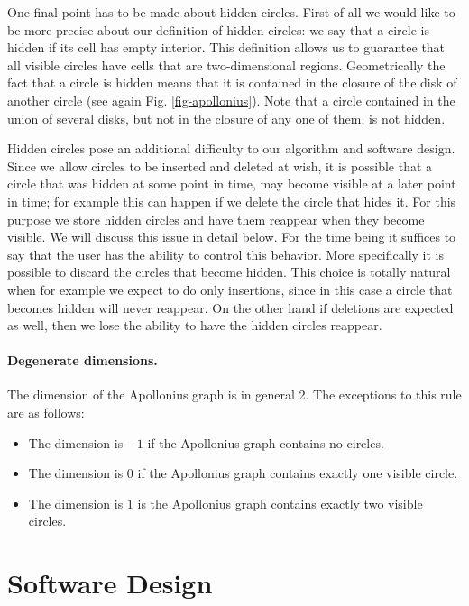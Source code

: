 One final point has to be made about hidden circles. First of all we
would like to be more precise about our definition of hidden circles:
we say that a circle is hidden if its cell has empty interior. This
definition allows us to guarantee that all visible circles have
cells that are two-dimensional regions.
Geometrically the fact that a circle is hidden means that it is
contained in the closure of the disk of another circle (see again
Fig. \ref{fig-apollonius}). Note that a circle contained in the union
of several disks, but not in the closure of any one of them, is not
hidden. 

Hidden circles pose an additional
difficulty to our algorithm and software design. Since we allow
circles to be inserted and deleted at wish, it is possible that a
circle that was hidden at some point in time, may become visible at
a later point in time; for example this can happen if we delete the
circle that hides it. For this purpose we store hidden circles and
have them reappear when they become visible. We will discuss this
issue in detail below. For the time being it suffices to say that the
user has the ability to control this behavior. More specifically it is
possible to discard the circles that become hidden. This choice is
totally natural when for example we expect to do only insertions,
since in this case a circle that becomes hidden will never
reappear. On the other hand if deletions are expected as well, then we
lose the ability to have the hidden circles reappear.

\paragraph{Degenerate dimensions.}
The dimension of the Apollonius graph is in general 2. The exceptions
to this rule are as follows:
\begin{itemize}
\item The dimension is $-1$ if the Apollonius graph contains no circles.
\item The dimension is $0$ if the Apollonius graph contains exactly
  one visible circle.
\item The dimension is $1$ is the Apollonius graph contains exactly
  two visible circles.
\end{itemize}


\section{Software Design}
\label{sec:apollonius2-design}

